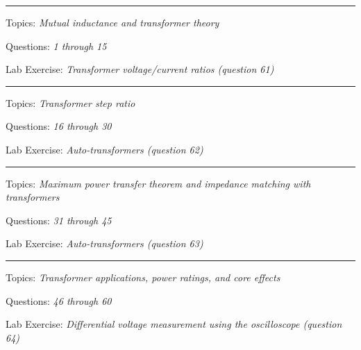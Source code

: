 \vskip 5pt

\hrule \vskip 5pt
\noindent
{}

\hskip 10pt Topics: {\it Mutual inductance and transformer theory}
 
\hskip 10pt Questions: {\it 1 through 15}
 
\hskip 10pt Lab Exercise: {\it Transformer voltage/current ratios (question 61)}
 


\vskip 10pt
\hrule \vskip 5pt
\noindent
{}

\hskip 10pt Topics: {\it Transformer step ratio}
 
\hskip 10pt Questions: {\it 16 through 30}
 
\hskip 10pt Lab Exercise: {\it Auto-transformers (question 62)}
 



\vskip 10pt
\hrule \vskip 5pt
\noindent
{}

\hskip 10pt Topics: {\it Maximum power transfer theorem and impedance matching with transformers}
 
\hskip 10pt Questions: {\it 31 through 45}
 
\hskip 10pt Lab Exercise: {\it Auto-transformers (question 63)}
 
\vskip 10pt
\hrule \vskip 5pt
\noindent
{}

\hskip 10pt Topics: {\it Transformer applications, power ratings, and core effects}
 
\hskip 10pt Questions: {\it 46 through 60}
 
\hskip 10pt Lab Exercise: {\it Differential voltage measurement using the oscilloscope (question 64)}
 

